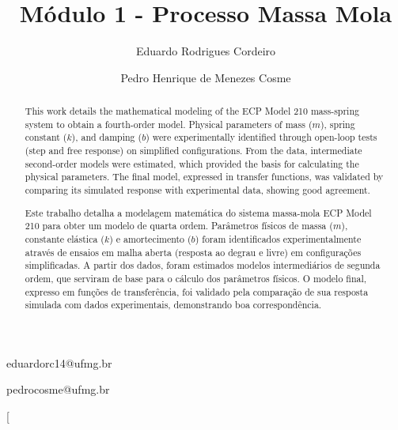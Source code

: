 \documentclass[conference,harvard,brazil,english]{sbatex}
\begin{document}


\title{Módulo 1 - Processo Massa Mola}

%
%

\author{Eduardo Rodrigues Cordeiro}{eduardorc14@ufmg.br}
\author{Pedro Henrique de Menezes Cosme}{pedrocosme@ufmg.br}

\twocolumn[

\maketitle

\begin{abstract}
This work details the mathematical modeling of the ECP Model 210 mass-spring system to obtain a fourth-order model. Physical parameters of mass ($m$), spring constant ($k$), and damping ($b$) were experimentally identified through open-loop tests (step and free response) on simplified configurations. From the data, intermediate second-order models were estimated, which provided the basis for calculating the physical parameters. The final model, expressed in transfer functions, was validated by comparing its simulated response with experimental data, showing good agreement.  \end{abstract}


\begin{abstract}
Este trabalho detalha a modelagem matemática do sistema massa-mola ECP Model 210 para obter um modelo de quarta ordem. Parâmetros físicos de massa ($m$), constante elástica ($k$) e amortecimento ($b$) foram identificados experimentalmente através de ensaios em malha aberta (resposta ao degrau e livre) em configurações simplificadas. A partir dos dados, foram estimados modelos intermediários de segunda ordem, que serviram de base para o cálculo dos parâmetros físicos. O modelo final, expresso em funções de transferência, foi validado pela comparação de sua resposta simulada com dados experimentais, demonstrando boa correspondência.
\end{abstract}
\end{document}

